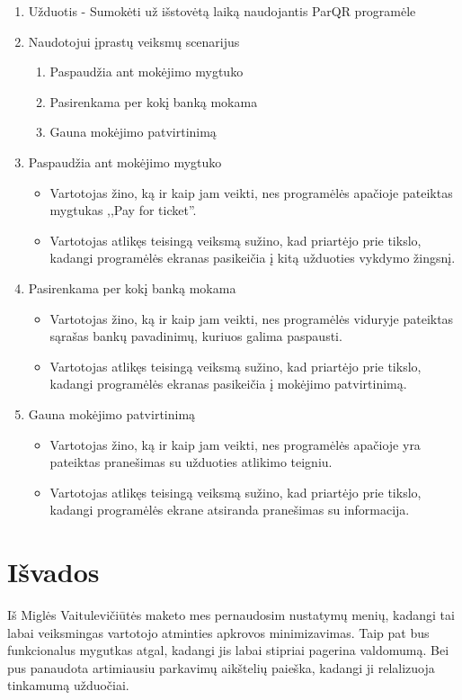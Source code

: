 \documentclass{VUMIFPSkursinis}
\begin{document}
\begin{enumerate}
\item Užduotis - Sumokėti už išstovėtą laiką naudojantis ParQR programėle
\item Naudotojui įprastų veiksmų scenarijus
\begin{enumerate}
\item Paspaudžia ant mokėjimo mygtuko
\item Pasirenkama per kokį banką mokama
\item Gauna mokėjimo patvirtinimą
\end{enumerate} 
\item Paspaudžia ant mokėjimo mygtuko
\begin{itemize}
\item Vartotojas žino, ką ir kaip jam veikti, nes programėlės apačioje pateiktas mygtukas ,,Pay for ticket''.
\item Vartotojas atlikęs teisingą veiksmą sužino, kad priartėjo prie tikslo, kadangi programėlės ekranas pasikeičia į kitą užduoties vykdymo žingsnį.
\end{itemize}
\item Pasirenkama per kokį banką mokama
\begin{itemize}
\item Vartotojas žino, ką ir kaip jam veikti, nes programėlės viduryje pateiktas sąrašas bankų pavadinimų, kuriuos galima paspausti.
\item Vartotojas atlikęs teisingą veiksmą sužino, kad priartėjo prie tikslo, kadangi programėlės ekranas pasikeičia į mokėjimo patvirtinimą.
\end{itemize}
\item Gauna mokėjimo patvirtinimą
\begin{itemize}
\item Vartotojas žino, ką ir kaip jam veikti, nes programėlės apačioje yra pateiktas pranešimas su užduoties atlikimo teigniu.
\item Vartotojas atlikęs teisingą veiksmą sužino, kad priartėjo prie tikslo, kadangi programėlės ekrane atsiranda pranešimas su informacija.
\end{itemize}
\end{enumerate}

\section{Išvados}

Iš Miglės Vaitulevičiūtės maketo mes pernaudosim nustatymų menių, kadangi tai labai veiksmingas vartotojo atminties apkrovos minimizavimas. Taip pat bus funkcionalus mygutkas atgal, kadangi jis labai stipriai pagerina valdomumą. Bei pus panaudota artimiausiu parkavimų aikštelių paieška, kadangi ji relalizuoja tinkamumą užduočiai.
\end{document}

